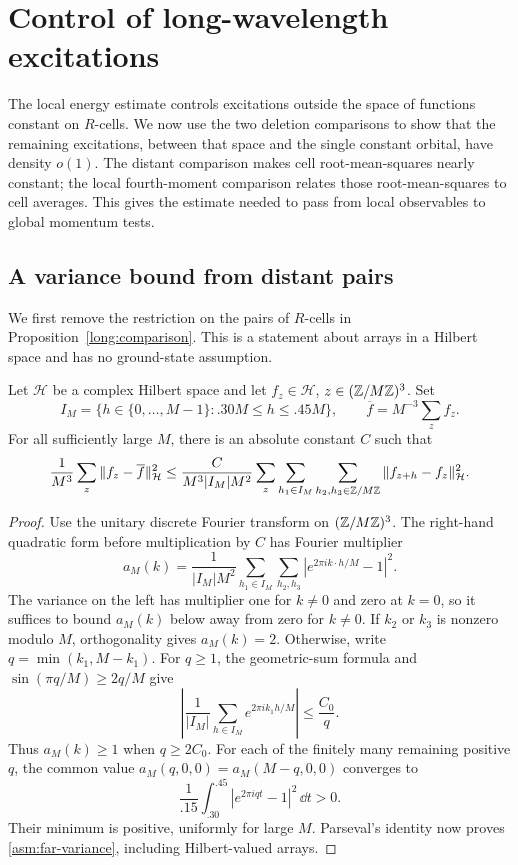\section{Control of long-wavelength excitations}\label{asm:section}\label{sec:assembly}

The local energy estimate controls excitations outside the space of
functions constant on $R$-cells. We now use the two deletion comparisons
to show that the remaining excitations, between that space and the single
constant orbital, have density $o(1)$. The distant comparison makes cell
root-mean-squares nearly constant; the local fourth-moment comparison
relates those root-mean-squares to cell averages. This gives the estimate
needed to pass from local observables to global momentum tests.

\subsection{A variance bound from distant pairs}

We first remove the restriction on the pairs of $R$-cells in
Proposition~\ref{long:comparison}. This is a statement about arrays in
a Hilbert space and has no ground-state assumption.

\begin{lemma}\label{asm:far-pairs}
Let $\mathcal H$ be a complex Hilbert space and let
$f_z\in\mathcal H$, $z\in(\mathbb Z/M\mathbb Z)^3$. Set
\[
 I_M=\{h\in\{0,\ldots,M-1\}:.30M\le h\le .45M\},
 \qquad \overline f=M^{-3}\sum_z f_z.
\]
For all sufficiently large $M$, there is an absolute constant $C$ such
that
\begin{equation}\label{asm:far-variance}
 \frac1{M^3}\sum_z\|f_z-\overline f\|_{\mathcal H}^2
 \le \frac{C}{M^3|I_M|M^2}
      \sum_z\sum_{h_1\in I_M}\sum_{h_2,h_3\in\mathbb Z/M\mathbb Z}
             \|f_{z+h}-f_z\|_{\mathcal H}^2.
\end{equation}
\end{lemma}

\begin{proof}
Use the unitary discrete Fourier transform on $(\mathbb Z/M\mathbb Z)^3$.
The right-hand quadratic form before multiplication by $C$ has Fourier
multiplier
\[
 a_M(k)=\frac1{|I_M|M^2}
   \sum_{h_1\in I_M}\sum_{h_2,h_3}
       |e^{2\pi i k\cdot h/M}-1|^2.
\]
The variance on the left has multiplier one for $k\ne0$ and zero at
$k=0$, so it suffices to bound $a_M(k)$ below away from zero for $k\ne0$.
If $k_2$ or $k_3$ is nonzero modulo $M$, orthogonality gives $a_M(k)=2$.
Otherwise, write $q=\min(k_1,M-k_1)$. For $q\ge1$, the geometric-sum
formula and $\sin(\pi q/M)\ge2q/M$ give
\[
 \left|\frac1{|I_M|}\sum_{h\in I_M}e^{2\pi i k_1h/M}\right|
        \le \frac{C_0}{q}.
\]
Thus $a_M(k)\ge1$ when $q\ge2C_0$. For each of the finitely many
remaining positive $q$, the common value
$a_M(q,0,0)=a_M(M-q,0,0)$ converges to
\[
 \frac1{.15}\int_{.30}^{.45}|e^{2\pi i q t}-1|^2\,\dd t>0.
\]
Their minimum is positive, uniformly for large $M$. Parseval's identity
now proves \eqref{asm:far-variance}, including Hilbert-valued arrays.
\end{proof}

